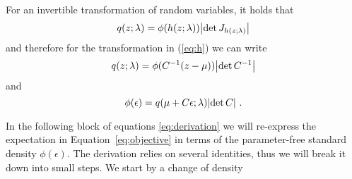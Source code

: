 \documentclass[11pt]{article}
\begin{document}
For an invertible transformation of random variables, it holds that 
\begin{equation}\label{eq:change-to-phi}
q(z;\lambda) = \phi(h(z; \lambda))\abs{\det J_{h(z; \lambda)}}
\end{equation}
and therefore for the transformation in (\ref{eq:h}) we can write
\begin{equation}
q(z;\lambda) = \phi(C^{-1}(z - \mu))\abs{\det C^{-1}} 
\end{equation}
and
\begin{equation}
\phi(\epsilon) = q(\mu + C\epsilon; \lambda)\abs{\det C} ~ .
\end{equation}

In the following block of equations \eqref{eq:derivation} we will re-express the expectation in Equation~\eqref{eq:objective} in terms of the parameter-free standard density $\phi(\epsilon)$. The derivation relies on several identities, thus we will break it down into small steps. 
We start by a change of density 
\end{document}
